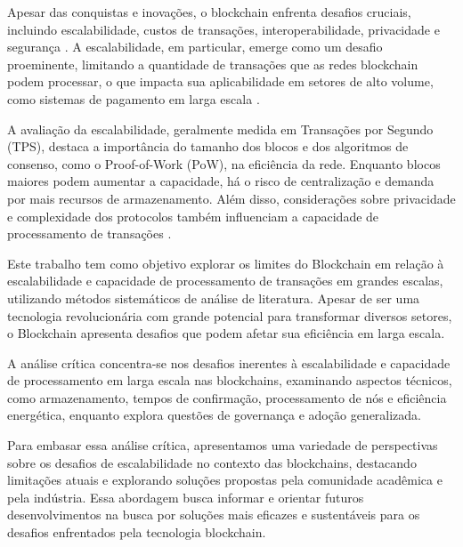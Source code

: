 Apesar das conquistas e inovações, o blockchain enfrenta desafios cruciais, incluindo escalabilidade, custos de transações, interoperabilidade, privacidade e segurança \cite{Scalability}. A escalabilidade, em particular, emerge como um desafio proeminente, limitando a quantidade de transações que as redes blockchain podem processar, o que impacta sua aplicabilidade em setores de alto volume, como sistemas de pagamento em larga escala \cite{Buterin2013}.

A avaliação da escalabilidade, geralmente medida em Transações por Segundo (TPS), destaca a importância do tamanho dos blocos e dos algoritmos de consenso, como o Proof-of-Work (PoW), na eficiência da rede. Enquanto blocos maiores podem aumentar a capacidade, há o risco de centralização e demanda por mais recursos de armazenamento. Além disso, considerações sobre privacidade e complexidade dos protocolos também influenciam a capacidade de processamento de transações \cite{Proof-of-Work}.

Este trabalho tem como objetivo explorar os limites do Blockchain em relação à escalabilidade e capacidade de processamento de transações em grandes escalas, utilizando métodos sistemáticos de análise de literatura. Apesar de ser uma tecnologia revolucionária com grande potencial para transformar diversos setores, o Blockchain apresenta desafios que podem afetar sua eficiência em larga escala.

A análise crítica concentra-se nos desafios inerentes à escalabilidade e capacidade de processamento em larga escala nas blockchains, examinando aspectos técnicos, como armazenamento, tempos de confirmação, processamento de nós e eficiência energética, enquanto explora questões de governança e adoção generalizada.

Para embasar essa análise crítica, apresentamos uma variedade de perspectivas sobre os desafios de escalabilidade no contexto das blockchains, destacando limitações atuais e explorando soluções propostas pela comunidade acadêmica e pela indústria. Essa abordagem busca informar e orientar futuros desenvolvimentos na busca por soluções mais eficazes e sustentáveis para os desafios enfrentados pela tecnologia blockchain.
